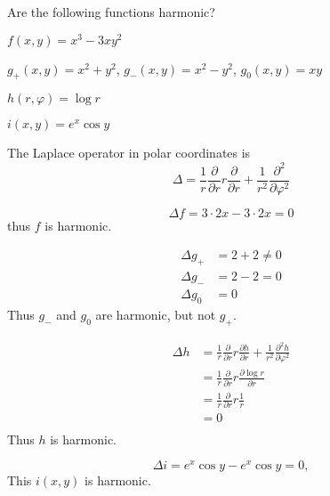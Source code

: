 Are the following functions harmonic?
\begin{teilaufgaben}
\item $f(x,y)=x^3-3xy^2$
\item $g_+(x,y)=x^2+y^2$, $g_-(x,y)=x^2-y^2$, $g_0(x,y)=xy$
\item $h(r,\varphi)=\log r$
\item $i(x,y)=e^x\cos y$
\end{teilaufgaben}

\begin{hinweis}
The Laplace operator in polar coordinates is
\[
\Delta =
\frac1r\frac{\partial}{\partial r}r\frac{\partial}{\partial r}
+
\frac1{r^2}\frac{\partial^2}{\partial\varphi^2}
\]
\end{hinweis}

\begin{loesung}
\begin{teilaufgaben}
\item
\[
\Delta f
=
3\cdot 2x-3\cdot 2x=0
\]
thus $f$ is harmonic.
\item
\begin{align*}
\Delta g_+
&=
2+2\ne 0
\\
\Delta g_-
&=
2-2=0
\\
\Delta g_0
&=
0
\end{align*}
Thus $g_-$ and $g_0$ are harmonic, but not $g_+$.
\item
\begin{align*}
\Delta h&=
\frac1r\frac{\partial}{\partial r}r\frac{\partial h}{\partial r}
+
\frac1{r^2}\frac{\partial^2 h}{\partial\varphi^2}
\\
&=
\frac1r\frac{\partial}{\partial r}r\frac{\partial \log r}{\partial r}
\\
&=
\frac1r\frac{\partial}{\partial r}r\frac1r
\\
&=0
\\
\end{align*}
Thus $h$ is harmonic.
\item
\[
\Delta i=e^x\cos y-e^x\cos y=0,
\]
This $i(x,y)$ is harmonic.
\qedhere
\end{teilaufgaben}
\end{loesung}
